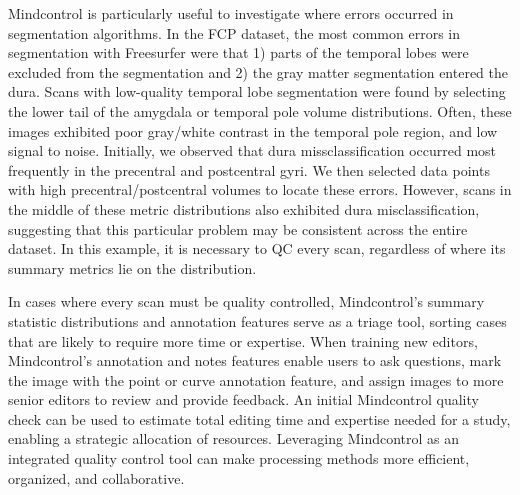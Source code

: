 Mindcontrol is particularly useful to investigate where errors occurred in segmentation algorithms. In the FCP dataset, the most common errors in segmentation with Freesurfer were that 1) parts of the temporal lobes were excluded from the segmentation and 2) the gray matter segmentation entered the dura. Scans with low-quality temporal lobe segmentation were found by selecting the lower tail of the amygdala or temporal pole volume distributions. Often, these images exhibited poor gray/white contrast in the temporal pole region, and low signal to noise. Initially, we observed that dura missclassification occurred most frequently in the precentral and postcentral gyri. We then selected data points with high precentral/postcentral volumes to locate these errors. However, scans in the middle of these metric distributions also exhibited dura misclassification, suggesting that this particular problem may be consistent across the entire dataset. In this example, it is necessary to QC every scan, regardless of where its summary metrics lie on the distribution.  

In cases where every scan must be quality controlled, Mindcontrol's summary statistic distributions and annotation features serve as a triage tool, sorting cases that are likely to require more time or expertise. When training new editors, Mindcontrol's annotation and notes features enable users to ask questions, mark the image with the point or curve annotation feature, and assign images to more senior editors to review and provide feedback. An initial Mindcontrol quality check can be used to estimate total editing time and expertise needed for a study, enabling a strategic allocation of resources. Leveraging Mindcontrol as an integrated quality control tool can make processing methods more efficient, organized, and collaborative.



